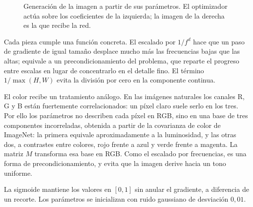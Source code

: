 \documentclass[11pt,a4paper]{article}
\newcommand{\vx}{\mathbf{x}}
\begin{document}
\begin{figure}[!htb]
\centering
{}
\caption{Generación de la imagen a partir de sus parámetros. El optimizador
actúa sobre los coeficientes de la izquierda; la imagen de la derecha es la
que recibe la red.}
\label{fig:param}
\end{figure}

Cada pieza cumple una función concreta. El escalado por $1/f^{d}$ hace que
un paso de gradiente de igual tamaño desplace mucho más las frecuencias
bajas que las altas; equivale a un precondicionamiento del problema, que
reparte el progreso entre escalas en lugar de concentrarlo en el detalle
fino. El término $1/\max(H,W)$ evita la división por cero en la componente
continua.

El color recibe un tratamiento análogo. En las imágenes naturales los
canales R, G y B están fuertemente correlacionados: un píxel claro suele
serlo en los tres. Por ello los parámetros no describen cada píxel en RGB,
sino en una base de tres componentes incorreladas, obtenida a partir de la
covarianza de color de ImageNet: la primera equivale aproximadamente a la
luminosidad, y las otras dos, a contrastes entre colores, rojo frente a
azul y verde frente a magenta. La matriz $M$ transforma esa base en RGB.
Como el escalado por frecuencias, es una forma de precondicionamiento, y
evita que la imagen derive hacia un tono uniforme.

La sigmoide mantiene los valores en $[0,1]$
sin anular el gradiente, a diferencia de un recorte. Los parámetros se
inicializan con ruido gaussiano de desviación $0{,}01$.
\end{document}
